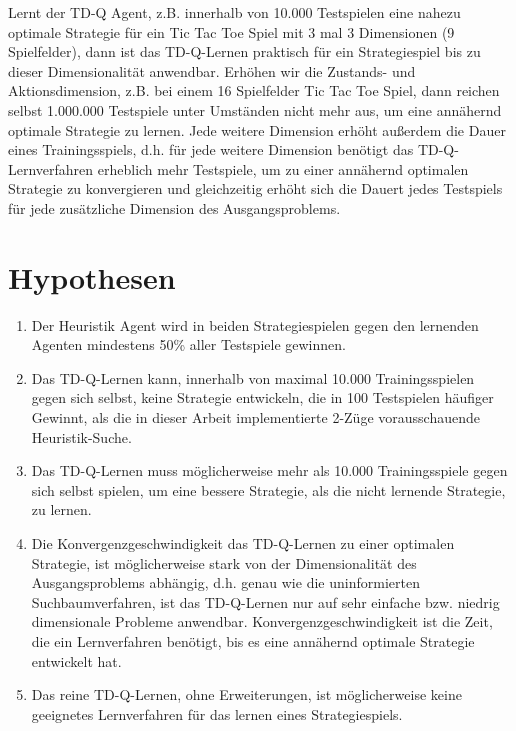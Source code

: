 Lernt der TD-Q Agent, z.B. innerhalb von 10.000 Testspielen eine nahezu optimale Strategie für ein Tic Tac Toe Spiel mit 3 mal 3 Dimensionen (9 Spielfelder), dann ist das TD-Q-Lernen praktisch für ein Strategiespiel bis zu dieser Dimensionalität anwendbar. Erhöhen wir die Zustands- und Aktionsdimension, z.B. bei einem 16 Spielfelder Tic Tac Toe Spiel, dann reichen selbst 1.000.000 Testspiele unter Umständen nicht mehr aus, um eine annähernd optimale Strategie zu lernen. Jede weitere Dimension erhöht außerdem die Dauer eines Trainingsspiels, d.h. für jede weitere Dimension benötigt das TD-Q-Lernverfahren erheblich mehr Testspiele, um zu einer annähernd optimalen Strategie zu konvergieren und gleichzeitig erhöht sich die Dauert jedes Testspiels für jede zusätzliche Dimension des Ausgangsproblems.

\section{Hypothesen}
\label{sec:Hypothese}
\begin{enumerate}
\item Der Heuristik Agent wird in beiden Strategiespielen gegen den lernenden Agenten mindestens 50\% aller Testspiele gewinnen.
\item Das TD-Q-Lernen kann, innerhalb von maximal 10.000 Trainingsspielen gegen sich selbst, keine Strategie entwickeln, die in 100 Testspielen häufiger Gewinnt, als die in dieser Arbeit implementierte 2-Züge vorausschauende Heuristik-Suche.
\item Das TD-Q-Lernen muss möglicherweise mehr als 10.000 Trainingsspiele gegen sich selbst spielen, um eine bessere Strategie, als die nicht lernende Strategie, zu lernen.
\item Die Konvergenzgeschwindigkeit das TD-Q-Lernen zu einer optimalen Strategie, ist möglicherweise stark von der Dimensionalität des Ausgangsproblems abhängig, d.h. genau wie die uninformierten Suchbaumverfahren, ist das TD-Q-Lernen nur auf sehr einfache bzw. niedrig dimensionale Probleme anwendbar. Konvergenzgeschwindigkeit ist die Zeit, die ein Lernverfahren benötigt, bis es eine annähernd optimale Strategie entwickelt hat.
\item Das reine TD-Q-Lernen, ohne Erweiterungen, ist möglicherweise keine geeignetes Lernverfahren für das lernen eines Strategiespiels.  
\end{enumerate}









